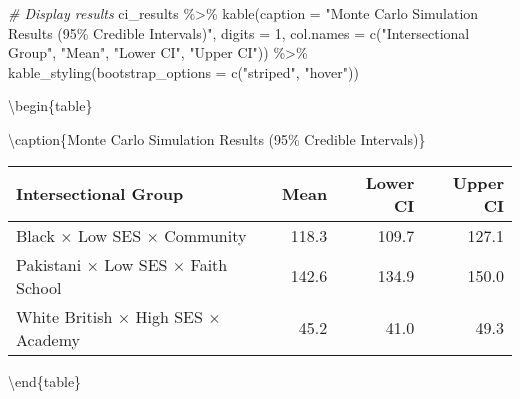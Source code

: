 \documentclass[
]{article}
\newenvironment{Shaded}{\begin{snugshade}}{\end{snugshade}}
\newcommand{\AttributeTok}[1]{\textcolor[rgb]{0.77,0.63,0.00}{#1}}
\newcommand{\CommentTok}[1]{\textcolor[rgb]{0.56,0.35,0.01}{\textit{#1}}}
\newcommand{\DecValTok}[1]{\textcolor[rgb]{0.00,0.00,0.81}{#1}}
\newcommand{\FunctionTok}[1]{\textcolor[rgb]{0.00,0.00,0.00}{#1}}
\newcommand{\NormalTok}[1]{#1}
\newcommand{\SpecialCharTok}[1]{\textcolor[rgb]{0.00,0.00,0.00}{#1}}
\newcommand{\StringTok}[1]{\textcolor[rgb]{0.31,0.60,0.02}{#1}}
\begin{document}
\begin{Shaded}
\begin{Highlighting}[]
\CommentTok{\# Display results}
\NormalTok{ci\_results }\SpecialCharTok{\%\textgreater{}\%}
  \FunctionTok{kable}\NormalTok{(}\AttributeTok{caption =} \StringTok{"Monte Carlo Simulation Results (95\% Credible Intervals)"}\NormalTok{, }
        \AttributeTok{digits =} \DecValTok{1}\NormalTok{,}
        \AttributeTok{col.names =} \FunctionTok{c}\NormalTok{(}\StringTok{"Intersectional Group"}\NormalTok{, }\StringTok{"Mean"}\NormalTok{, }\StringTok{"Lower CI"}\NormalTok{, }\StringTok{"Upper CI"}\NormalTok{)) }\SpecialCharTok{\%\textgreater{}\%}
  \FunctionTok{kable\_styling}\NormalTok{(}\AttributeTok{bootstrap\_options =} \FunctionTok{c}\NormalTok{(}\StringTok{"striped"}\NormalTok{, }\StringTok{"hover"}\NormalTok{))}
\end{Highlighting}
\end{Shaded}

\textbackslash begin\{table\}

\textbackslash caption\{\label{tab:spatial-monte-carlo}Monte Carlo
Simulation Results (95\% Credible Intervals)\} \centering

\begin{tabular}[t]{l|r|r|r}
\hline
Intersectional Group & Mean & Lower CI & Upper CI\\
\hline
Black × Low SES × Community & 118.3 & 109.7 & 127.1\\
\hline
Pakistani × Low SES × Faith School & 142.6 & 134.9 & 150.0\\
\hline
White British × High SES × Academy & 45.2 & 41.0 & 49.3\\
\hline
\end{tabular}

\textbackslash end\{table\}
\end{document}
